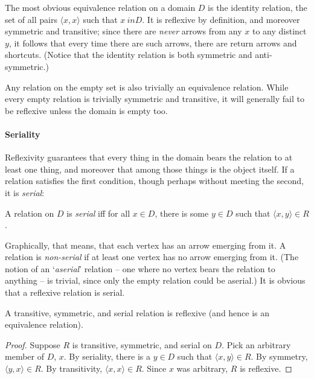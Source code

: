 The most obvious equivalence relation on a domain $D$ is the identity relation, the set of all pairs $\langle x, x\rangle$ such that $x\ in D$. It is reflexive by definition, and moreover symmetric and transitive; since there are \emph{never} arrows from any $x$ to any distinct $y$, it follows that every time there are such arrows, there are return arrows and shortcuts. (Notice that the identity relation is both symmetric and anti-symmetric.)

Any relation on the empty set is also trivially an equivalence relation. While every empty relation is trivially symmetric and transitive, it will generally fail to be reflexive unless the domain is empty too.

\paragraph{Seriality}
Reflexivity guarantees that every thing in the domain bears the relation to at least one thing, and moreover that among those things is the object itself. If a relation satisfies the first condition, though perhaps without meeting the second, it is \emph{serial}:
\begin{definition}[Serial]
  A relation on $D$ is \emph{serial} iff for all $x\in D$, there is some $y\in D$ such that $\langle x,y\rangle\in R$. 
\end{definition} Graphically, that means, that each vertex has an arrow emerging from it. A relation is \emph{non-serial} if at least one vertex has no arrow emerging from it. (The notion of an `\emph{aserial}' relation – one where no vertex bears the relation to anything – is trivial, since only the empty relation could be aserial.) It is obvious that a reflexive relation is serial. 
\begin{theorem}
A transitive, symmetric, and serial relation is reflexive (and hence is an equivalence relation).
\begin{proof}
  Suppose $R$ is transitive, symmetric, and serial on $D$. Pick an arbitrary member of $D$, $x$. By seriality, there is a $y\in D$ such that $\langle x,y\rangle\in R$. By symmetry, $\langle y,x\rangle\in R$. By transitivity, $\langle x,x\rangle\in R$. Since $x$ was arbitrary, $R$ is reflexive.\end{proof}
\end{theorem}

